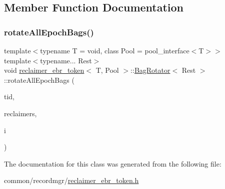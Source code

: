 \subsection{Member Function Documentation}
\mbox{\label{classreclaimer__ebr__token_1_1BagRotator_af0eeccfb61bdb4ca3e7f4282282d18e1}} 
\subsubsection{\texorpdfstring{rotate\+All\+Epoch\+Bags()}{rotateAllEpochBags()}}
{\footnotesize\ttfamily template$<$typename T  = void, class Pool  = pool\+\_\+interface$<$\+T$>$$>$ \\
template$<$typename... Rest$>$ \\
void \hyperlink{classreclaimer__ebr__token}{reclaimer\+\_\+ebr\+\_\+token}$<$ T, Pool $>$\+::\hyperlink{classreclaimer__ebr__token_1_1BagRotator}{Bag\+Rotator}$<$ Rest $>$\+::rotate\+All\+Epoch\+Bags (\begin{DoxyParamCaption}\item[{const int}]{tid,  }\item[{void $\ast$const $\ast$const}]{reclaimers,  }\item[{const int}]{i }\end{DoxyParamCaption})\hspace{0.3cm}{\ttfamily [inline]}}



The documentation for this class was generated from the following file\+:\begin{DoxyCompactItemize}
\item 
common/recordmgr/\hyperlink{reclaimer__ebr__token_8h}{reclaimer\+\_\+ebr\+\_\+token.\+h}\end{DoxyCompactItemize}
